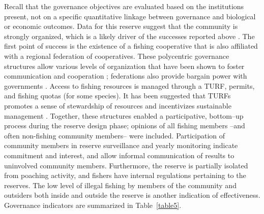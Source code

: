 \documentclass[10pt,letterpaper]{article}
\begin{document}
Recall that the governance objectives are evaluated based on the institutions present, not on a specific quantitative linkage between governance and biological or economic outcomes. Data for this reserve suggest that the community is strongly organized, which is a likely driver of the successes reported above \cite{gutirrez_2011-0U}. The first point of success is the existence of a fishing cooperative that is also affiliated with a regional federation of cooperatives. These polycentric governance structures allow various levels of organization that have been shown to foster communication and cooperation \cite{mccay_2014-CN,espinosaromero_2014-PY}; federations also provide bargain power with governments \cite{espinosaromero_2014-PY,finkbeiner_2015-87}. Access to fishing resources is managed through a TURF, permits, and fishing quotas (for some species). It has been suggested that TURFs promotes a sense of stewardship of resources and incentivizes sustainable management \cite{mccay_2017-1m}. Together, these structures enabled a participative, bottom–up process during the reserve design phase; opinions of all fishing members --and often non-fishing community members-- were included. Participation of community members in reserve surveillance and yearly monitoring indicate commitment and interest, and allow informal communication of results to uninvolved community members. Furthermore, the reserve is partially isolated from poaching activity, and fishers have internal regulations pertaining to the reserves. The low level of illegal fishing by members of the community and outsiders both inside and outside the reserve is another indication of effectiveness. Governance indicators are summarized in Table~\ref{table5}.
\end{document}
